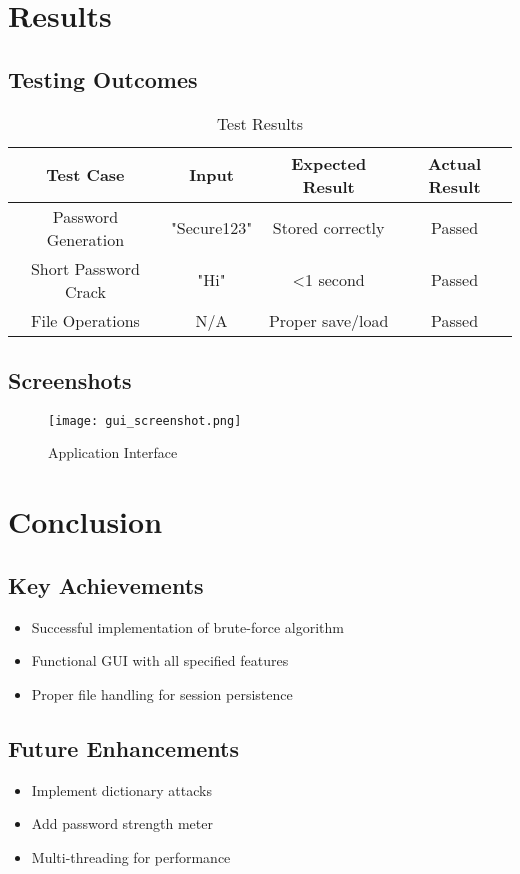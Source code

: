 \documentclass[12pt,a4paper]{report}
\begin{document}
\chapter{Results}
\section{Testing Outcomes}
\begin{table}[H]
    \centering
    \begin{tabular}{|c|c|c|c|}
    \hline
    Test Case & Input & Expected Result & Actual Result \\ \hline
    Password Generation & "Secure123" & Stored correctly & Passed \\ \hline
    Short Password Crack & "Hi" & <1 second & Passed \\ \hline
    File Operations & N/A & Proper save/load & Passed \\ \hline
    \end{tabular}
    \caption{Test Results}
\end{table}

\section{Screenshots}
\begin{figure}[H]
    \centering
    \texttt{[image: gui\_screenshot.png]}
    \caption{Application Interface}
\end{figure}

\chapter{Conclusion}
\section{Key Achievements}
\begin{itemize}
    \item Successful implementation of brute-force algorithm
    \item Functional GUI with all specified features
    \item Proper file handling for session persistence
\end{itemize}

\section{Future Enhancements}
\begin{itemize}
    \item Implement dictionary attacks
    \item Add password strength meter
    \item Multi-threading for performance
\end{itemize}
\end{document}
